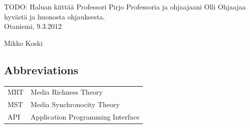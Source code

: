 \documentclass[english,12pt,a4paper,pdftex]{article}
\begin{document}
TODO: Haluan kiittää Professori Pirjo 
Professoria ja ohjaajaani Olli Ohjaajaa hyvästä ja 
huonosta ohjauksesta.\\

\vspace{5cm}
Otaniemi, 9.3.2012

\vspace{5mm}
{\hfill Mikko Koski \hspace{1cm}}

\newpage


\tableofcontents




\clearpage

\subsection*{Abbreviations}

\begin{tabular}{ll}
MRT         & Media Richness Theory \\
MST         & Media Synchronocity Theory \\
API         & Application Programming Interface
\end{tabular}


\cleardoublepage

\storeinipagenumber
{}
\setcounter{page}{1}
\end{document}
